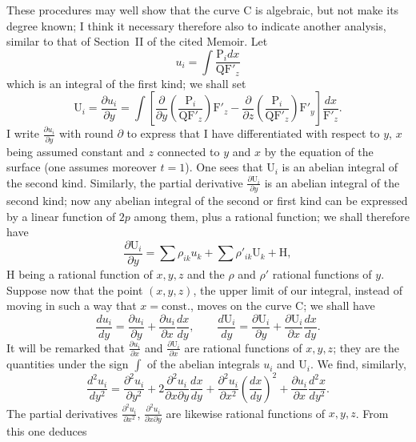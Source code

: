 \documentclass{article}
\begin{document}
These procedures may well show that the curve $\mathrm{C}$ is algebraic, but not make its degree known; I think it necessary therefore also to indicate another analysis, similar to that of Section~II of the cited Memoir. Let
\[
u_{i} = \int \frac{\mathrm{P}_{i} dx}{\mathrm{Q}\mathrm{F}'_{z}}
\]
which is an integral of the first kind; we shall set
\[
\mathrm{U}_{i} = \frac{\partial u_{i}}{\partial y} = \int \left[ \frac{\partial}{\partial y}\left(\frac{\mathrm{P}_{i}}{\mathrm{Q}\mathrm{F}'_{z}}\right)\mathrm{F}'_{z} - \frac{\partial}{\partial z}\left(\frac{\mathrm{P}_{i}}{\mathrm{Q}\mathrm{F}'_{z}}\right)\mathrm{F}'_{y} \right] \frac{dx}{\mathrm{F}'_{z}}.
\]
I write $\frac{\partial u_{i}}{\partial y}$ with round $\partial$ to express that I have differentiated with respect
to $y$, $x$ being assumed constant and $z$ connected to $y$ and $x$ by the equation of the surface (one assumes moreover $t = 1$). One sees that $\mathrm{U}_{i}$ is an abelian integral of the second kind. Similarly, the partial derivative $\frac{\partial \mathrm{U}_{i}}{\partial y}$ is an abelian integral of the second kind; now any abelian integral of the second or first kind can be expressed by a linear function of $2p$ among them, plus a rational function; we shall therefore have
\[
\frac{\partial \mathrm{U}_{i}}{\partial y} = \sum \rho_{ik} u_{k} + \sum \rho'_{ik} \mathrm{U}_{k} + \mathrm{H},
\]
$\mathrm{H}$ being a rational function of $x, y, z$ and the $\rho$ and $\rho'$ rational functions of $y$. Suppose now that the point $(x, y, z)$, the upper limit of our integral, instead of moving in such a way that $x = \mathrm{const.}$, moves on the curve $\mathrm{C}$; we shall have
\[
\frac{du_{i}}{dy} = \frac{\partial u_{i}}{\partial y} + \frac{\partial u_{i}}{\partial x}\frac{dx}{dy}, \qquad \frac{d\mathrm{U}_{i}}{dy} = \frac{\partial \mathrm{U}_{i}}{\partial y} + \frac{\partial \mathrm{U}_{i}}{\partial x}\frac{dx}{dy}.
\]
It will be remarked that $\frac{\partial u_{i}}{\partial x}$ and $\frac{\partial \mathrm{U}_{i}}{\partial x}$ are rational functions of $x, y, z$; they are the quantities under the sign $\displaystyle\int$ of the abelian integrals $u_{i}$ and $\mathrm{U}_{i}$. We find, similarly,
\[
\frac{d^{2}u_{i}}{dy^{2}} = \frac{\partial^{2}u_{i}}{\partial y^{2}} + 2 \frac{\partial^{2}u_{i}}{\partial x \partial y}\frac{dx}{dy} + \frac{\partial^{2}u_{i}}{\partial x^{2}}\left(\frac{dx}{dy}\right)^{2} + \frac{\partial u_{i}}{\partial x}\frac{d^{2}x}{dy^{2}}.
\]
The partial derivatives $\frac{\partial^{2}u_{i}}{\partial x^{2}}$, $\frac{\partial^{2}u_{i}}{\partial x \partial y}$ are likewise rational functions of $x, y, z$. From this one deduces
\end{document}
